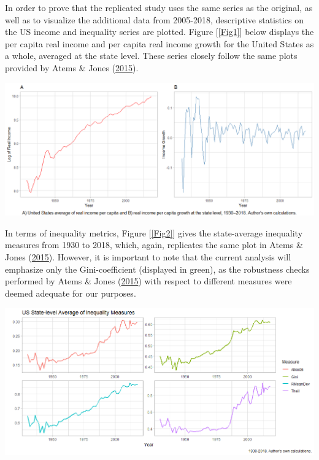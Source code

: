 \documentclass[11pt,preprint, authoryear]{elsarticle}
\let\origfigure\figure
\let\endorigfigure\endfigure
\renewenvironment{figure}[1][2] {
    \expandafter\origfigure\expandafter[H]
} {
    \endorigfigure
}
\numberwithin{equation}{section}
\numberwithin{figure}{section}
\numberwithin{table}{section}
\begin{document}
In order to prove that the replicated study uses the same series as the
original, as well as to visualize the additional data from 2005-2018,
descriptive statistics on the US income and inequality series are
plotted. Figure {[}\ref{Fig1}{]} below displays the per capita real
income and per capita real income growth for the United States as a
whole, averaged at the state level. These series closely follow the same
plots provided by Atems \& Jones (\protect\hyperlink{ref-atems}{2015}).

\begin{figure}[H]
\includegraphics[width=1\linewidth]{images/Fig1_US_Income_gridplot} \caption{\label{Fig1}}\label{fig:Fig1}
\end{figure}

In terms of inequality metrics, Figure {[}\ref{Fig2}{]} gives the
state-average inequality measures from 1930 to 2018, which, again,
replicates the same plot in Atems \& Jones
(\protect\hyperlink{ref-atems}{2015}). However, it is important to note
that the current analysis will emphasize only the Gini-coefficient
(displayed in green), as the robustness checks performed by Atems \&
Jones (\protect\hyperlink{ref-atems}{2015}) with respect to different
measures were deemed adequate for our purposes.

\begin{figure}[H]
\includegraphics[width=1\linewidth]{images/Fig2_Inequality_Measures} \caption{\label{Fig2}}\label{fig:Fig2}
\end{figure}
\end{document}

